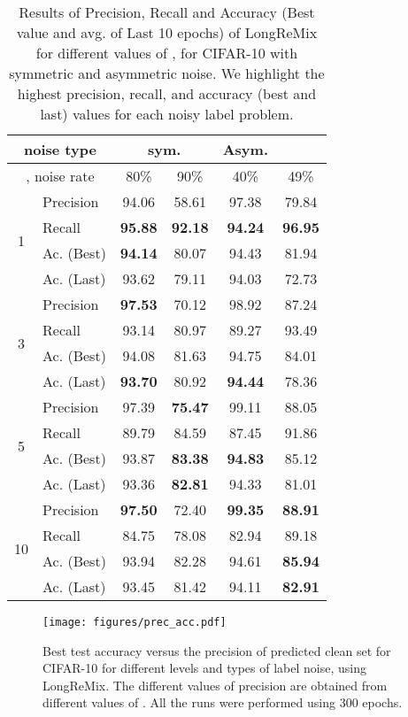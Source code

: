 \documentclass[review]{elsarticle}
\begin{document}
\begin{table}[ht]
\centering
\scriptsize
\begin{tabular}{cl||cc|cc}
\toprule
\multicolumn{2}{c}{noise type}& \multicolumn{2}{c}{sym.}& Asym. \\
\midrule
\multicolumn{2}{c}{, noise rate} & 80\% & 90\% & 40\% & 49\% \\
\midrule
\multirow{4}{*}{1}& Precision  &94.06 & 58.61 & 97.38& 79.84 \\ 
& Recall  & \textbf{95.88} &  \textbf{92.18}& \textbf{94.24}& \textbf{96.95} \\ 
& Ac. (Best) & \textbf{94.14} &80.07 & 94.43& 81.94\\ 
& Ac. (Last)  &93.62 & 79.11 & 94.03& 72.73\\ 
\midrule
\multirow{4}{*}{3}& Precision &\textbf{97.53} &70.12 &98.92 & 87.24\\ 
& Recall  &93.14 &80.97 & 89.27 & 93.49\\ 
& Ac. (Best) &94.08 &81.63 & 94.75 & 84.01\\ 
& Ac. (Last) &\textbf{93.70} &80.92 & \textbf{94.44}&78.36\\ 
\midrule
\multirow{4}{*}{5}& Precision &97.39 &\textbf{75.47} & 99.11& 88.05\\ 
& Recall  &89.79 & 84.59& 87.45& 91.86\\ 
& Ac. (Best)  &93.87 &\textbf{83.38} & \textbf{94.83}& 85.12\\ 
& Ac. (Last)  &93.36 &\textbf{82.81} & 94.33& 81.01\\ 
\midrule
\multirow{4}{*}{10}& Precision & \textbf{97.50} &72.40 & \textbf{99.35}& \textbf{88.91}\\ 
& Recall & 84.75 &78.08 & 82.94&89.18\\ 
& Ac. (Best)  &93.94 &82.28 & 94.61& \textbf{85.94}\\ 
& Ac. (Last) &93.45 &81.42 & 94.11& \textbf{82.91}\\ 
\bottomrule
\end{tabular}
\caption{Results of Precision, Recall and Accuracy (Best value and avg. of Last 10 epochs) of LongReMix for different values of , for CIFAR-10 with symmetric and asymmetric noise. We highlight the highest precision, recall, and accuracy (best and last) values for each noisy label problem.}
\label{tab:confidence_window}
\end{table}


\begin{figure}[t]
\centering
\texttt{[image: figures/prec\_acc.pdf]}
\caption{Best test accuracy versus the precision of predicted clean set for CIFAR-10 for different levels and types of label noise, using LongReMix. The different values of precision are obtained from  different values of . All the runs were performed using 300 epochs. 
}
\label{fig:prec_acc}
\end{figure}
\end{document}
